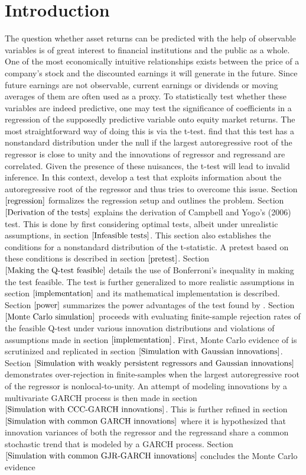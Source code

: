 \documentclass[11pt, a4paper]{article}
\begin{document}
\section{Introduction}
The question whether asset returns can be predicted with the help of observable variables is of great interest to financial institutions and the public as a whole. One of the most economically intuitive relationships exists between the price of a company's stock and the discounted earnings it will generate in the future. Since future earnings are not observable, current earnings or dividends or moving averages of them are often used as a proxy. To statistically test whether these variables are indeed predictive, one may test the significance of coefficients in a regression of the supposedly predictive variable onto equity market returns. The most straightforward way of doing this is via the t-test. \citet{elliott1994inference} find that this test has a nonstandard distribution under the null if the largest autoregressive root of the regressor is close to unity and the innovations of regressor and regressand are correlated. Given the presence of these nuisances, the t-test will lead to invalid inference. In this context, \citet{campbell2006efficient} develop a test that exploits information about the autoregressive root of the regressor and thus tries to overcome this issue. Section $\ref{regression}$ formalizes the regression setup and outlines the problem. Section $\ref{Derivation of the tests}$ explains the derivation of Campbell and Yogo's (2006) test. This is done by first considering optimal tests, albeit under unrealistic assumptions, in section $\ref{Infeasible tests}$. This section also establishes the conditions for a nonstandard distribution of the t-statistic. A pretest based on these conditions is described in section $\ref{pretest}$. Section $\ref{Making the Q-test feasible}$ details the use of Bonferroni's inequality in making the test feasible.  The test is further generalized to more realistic assumptions in section $\ref{implementation}$ and its mathematical implementation is described. Section $\ref{power}$ summarizes the power advantages of the test found by \citet{campbell2006efficient}. Section $\ref{Monte Carlo simulation}$ proceeds with evaluating finite-sample rejection rates of the feasible Q-test under various innovation distributions and violations of assumptions made in section $\ref{implementation}$. First, Monte Carlo evidence of \citet{campbell2006efficient} is scrutinized and replicated in section $\ref{Simulation with Gaussian innovations}$. Section $\ref{Simulation with weakly persistent regressors and Gaussian innovations}$ demonstrates over-rejection in finite-samples when the largest autoregressive root of the regressor is nonlocal-to-unity. An attempt of modeling innovations by a multivariate GARCH process is then made in section $\ref{Simulation with CCC-GARCH innovations}$. This is further refined in section $\ref{Simulation with common GARCH innovations}$ where it is hypothesized that innovation variances of both the regressor and the regressand share a common stochastic trend that is modeled by a GARCH process. Section $\ref{Simulation with common GJR-GARCH innovations}$ concludes the Monte Carlo evidence 
\end{document}

